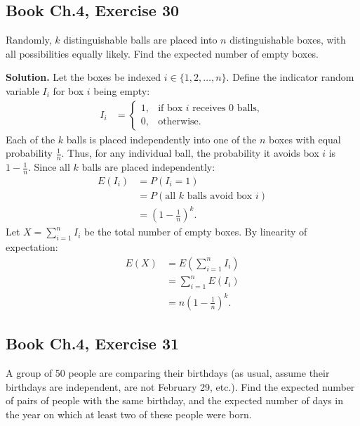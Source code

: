 \documentclass[11pt,a4paper]{article}
\begin{document}
\vspace{10pt}
\subsection{Book Ch.4, Exercise 30}
\begin{tcolorbox}[title={Book Ch.4, Exercise 30}]
Randomly, $k$ distinguishable balls are placed into $n$ distinguishable boxes, with all possibilities equally likely. Find the expected number of empty boxes.
\end{tcolorbox}

\noindent \textbf{Solution.} Let the boxes be indexed $i \in \{1, 2, \dots, n\}$. Define the indicator random variable $I_i$ for box $i$ being empty:
\begin{align*}
I_i &= \begin{cases}
1, & \text{if box } i \text{ receives } 0 \text{ balls}, \\
0, & \text{otherwise}.
\end{cases}
\end{align*}
Each of the $k$ balls is placed independently into one of the $n$ boxes with equal probability $\frac{1}{n}$. Thus, for any individual ball, the probability it avoids box $i$ is $1 - \frac{1}{n}$. Since all $k$ balls are placed independently:
\begin{align*}
E(I_i) &= P(I_i = 1) \\
&= P(\text{all } k \text{ balls avoid box } i) \\
&= \left(1 - \frac{1}{n}\right)^k.
\end{align*}
Let $X = \sum_{i=1}^{n} I_i$ be the total number of empty boxes. By linearity of expectation:
\begin{align*}
E(X) &= E\left( \sum_{i=1}^{n} I_i \right) \\
&= \sum_{i=1}^{n} E(I_i) \\
&= n \left(1 - \frac{1}{n}\right)^k.
\end{align*}

\vspace{10pt}
\subsection{Book Ch.4, Exercise 31}
\begin{tcolorbox}[title={Book Ch.4, Exercise 31}]
A group of 50 people are comparing their birthdays (as usual, assume their birthdays are independent, are not February 29, etc.). Find the expected number of pairs of people with the same birthday, and the expected number of days in the year on which at least two of these people were born.
\end{tcolorbox}
\end{document}
